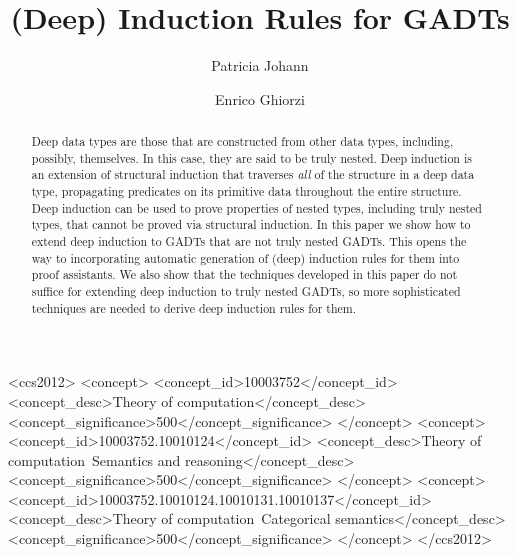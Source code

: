 \documentclass[sigplan,screen]{acmart}
\begin{document}
\title[(Deep) Induction Rules for GADTs]{(Deep) Induction Rules for GADTs}
  \author{Patricia Johann}
  \author{Enrico Ghiorzi}

\begin{abstract} 
  Deep data types are those that are constructed from other data types,
  including, possibly, themselves.  In this case, they are said to be
  truly nested.  Deep induction is an extension of structural
  induction that traverses {\em all} of the structure in a deep data
  type, propagating predicates on its primitive data throughout the
  entire structure.  Deep induction can be used to prove properties of
  nested types, including truly nested types, that cannot be proved
  via structural induction.  In this paper we show how to extend deep
  induction to GADTs that are not truly nested GADTs.  This opens the
  way to incorporating automatic generation of (deep) induction rules
  for them into proof assistants.  We also show that the techniques
  developed in this paper do not suffice for extending deep induction
  to truly nested GADTs, so more sophisticated techniques are needed
  to derive deep induction rules for them.
\end{abstract}

\begin{CCSXML}
<ccs2012>
<concept>
<concept_id>10003752</concept_id>
<concept_desc>Theory of computation</concept_desc>
<concept_significance>500</concept_significance>
</concept>
<concept>
<concept_id>10003752.10010124</concept_id>
<concept_desc>Theory of computation~Semantics and reasoning</concept_desc>
<concept_significance>500</concept_significance>
</concept>
<concept>
<concept_id>10003752.10010124.10010131.10010137</concept_id>
<concept_desc>Theory of computation~Categorical semantics</concept_desc>
<concept_significance>500</concept_significance>
</concept>
</ccs2012>
\end{CCSXML}



\end{document}
